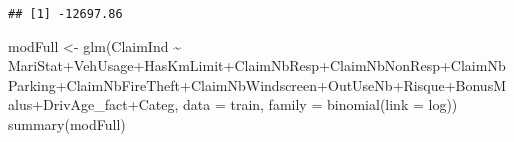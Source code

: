 \documentclass[
]{article}
\newenvironment{Shaded}{\begin{snugshade}}{\end{snugshade}}
\newcommand{\AttributeTok}[1]{\textcolor[rgb]{0.77,0.63,0.00}{#1}}
\newcommand{\FunctionTok}[1]{\textcolor[rgb]{0.00,0.00,0.00}{#1}}
\newcommand{\NormalTok}[1]{#1}
\newcommand{\OtherTok}[1]{\textcolor[rgb]{0.56,0.35,0.01}{#1}}
\newcommand{\SpecialCharTok}[1]{\textcolor[rgb]{0.00,0.00,0.00}{#1}}
\begin{document}
\begin{verbatim}
## [1] -12697.86
\end{verbatim}

\begin{Shaded}
\begin{Highlighting}[]
\NormalTok{modFull }\OtherTok{\textless{}{-}} \FunctionTok{glm}\NormalTok{(ClaimInd }\SpecialCharTok{\textasciitilde{}}\NormalTok{ MariStat}\SpecialCharTok{+}\NormalTok{VehUsage}\SpecialCharTok{+}\NormalTok{HasKmLimit}\SpecialCharTok{+}\NormalTok{ClaimNbResp}\SpecialCharTok{+}\NormalTok{ClaimNbNonResp}\SpecialCharTok{+}\NormalTok{ClaimNbParking}\SpecialCharTok{+}\NormalTok{ClaimNbFireTheft}\SpecialCharTok{+}\NormalTok{ClaimNbWindscreen}\SpecialCharTok{+}\NormalTok{OutUseNb}\SpecialCharTok{+}\NormalTok{Risque}\SpecialCharTok{+}\NormalTok{BonusMalus}\SpecialCharTok{+}\NormalTok{DrivAge\_fact}\SpecialCharTok{+}\NormalTok{Categ, }\AttributeTok{data =}\NormalTok{ train, }\AttributeTok{family =} \FunctionTok{binomial}\NormalTok{(}\AttributeTok{link =}\NormalTok{ log))}
\FunctionTok{summary}\NormalTok{(modFull)}
\end{Highlighting}
\end{Shaded}
\end{document}
